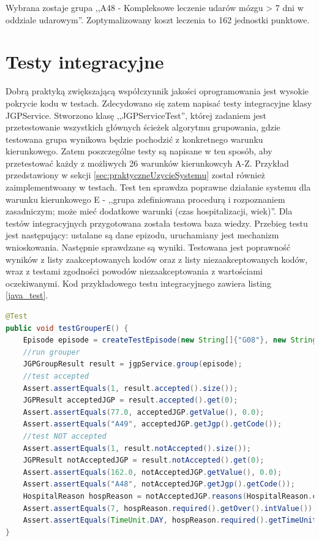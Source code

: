 Wybrana zostaje grupa ,,A48 - Kompleksowe leczenie udarów mózgu > 7 dni w oddziale udarowym''. Zoptymalizowany koszt leczenia to 162 jednostki punktowe.


\section{Testy integracyjne}
\label{sec:testyIntegracyjne}

Dobrą praktyką zwiększającą współczynnik jakości oprogramowania jest wysokie pokrycie kodu w testach. Zdecydowano się zatem napisać testy integracyjne klasy JGPService. Stworzono klasę ,,JGPServiceTest'', której zadaniem jest przetestowanie wszystkich głównych ścieżek algorytmu grupowania, gdzie testowana grupa wynikowa będzie pochodzić z konkretnego warunku kierunkowego. Zatem poszczególne testy są napisane w ten sposób, aby przetestować każdy z możliwych 26 warunków kierunkowcyh A-Z.
Przykład przedstawiony w sekcji \ref{sec:praktyczneUzycieSystemu} został również zaimplementwoany w testach. Test ten sprawdza poprawne działanie systemu dla warunku kierunkowego E - ,,grupa zdefiniowana procedurą i rozpoznaniem zasadniczym; może mieć dodatkowe warunki (czas hospitalizacji, wiek)''.
Dla testów integracyjnych przygotowana została testowa baza wiedzy. Przebieg testu jest następujący: ustalane są dane epizodu, uruchamiany jest mechanizm wnioskowania. Następnie sprawdzane są wyniki. Testowana jest poprawność wyników z listy zaakceptowanych kodów oraz z listy niezaakceptowanych kodów, wraz z testami zgodności powodów niezaakceptowania z wartościami oczekiwanymi.
Kod przykładowego testu integracyjnego zawiera listing \ref{java_test}.

\newpage
\begin{lstlisting}[language=Java,caption={Test integracyjny sprawdzający warunek kierunkowy ,,E''.},label=java_test]
@Test
public void testGrouperE() {
    Episode episode = createTestEpisode(new String[]{"G08"}, new String[]{"88.714"}, 7, 75);
    //run grouper
    JGPGroupResult result = jgpService.group(episode);
    //test accepted
    Assert.assertEquals(1, result.accepted().size());
    JGPResult acceptedJGP = result.accepted().get(0);
    Assert.assertEquals(77.0, acceptedJGP.getValue(), 0.0);
    Assert.assertEquals("A49", acceptedJGP.getJgp().getCode());
    //test NOT accepted
    Assert.assertEquals(1, result.notAccepted().size());
    JGPResult notAcceptedJGP = result.notAccepted().get(0);
    Assert.assertEquals(162.0, notAcceptedJGP.getValue(), 0.0);
    Assert.assertEquals("A48", notAcceptedJGP.getJgp().getCode());
    HospitalReason hospReason = notAcceptedJGP.reasons(HospitalReason.class).get(0);
    Assert.assertEquals(7, hospReason.required().getOver().intValue());
    Assert.assertEquals(TimeUnit.DAY, hospReason.required().getTimeUnit());
}
\end{lstlisting}

